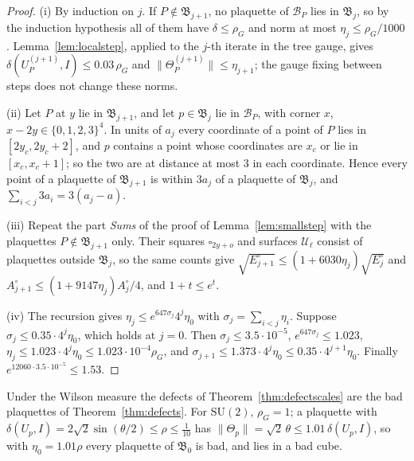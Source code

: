 \documentclass[11pt]{amsart}
\theoremstyle{definition}
\theoremstyle{remark}
\numberwithin{equation}{section}
\newcommand{\SU}{\mathrm{SU}}
\begin{document}
\begin{proof}
(i) By induction on $j$. If $P\notin\mathfrak B_{j+1}$, no plaquette of
$\mathcal B_P$ lies in $\mathfrak B_j$, so by the induction hypothesis all of
them have $\delta\le\rho_G$ and norm at most $\eta_j\le\rho_G/1000$.
Lemma~\ref{lem:localstep}, applied to the $j$-th iterate in the tree gauge,
gives $\delta(U^{(j+1)}_P,I)\le0.03\,\rho_G$ and $\lVert\Theta^{(j+1)}_P
\rVert\le\eta_{j+1}$; the gauge fixing between steps does not change these
norms.

(ii) Let $P$ at $y$ lie in $\mathfrak B_{j+1}$, and let $p\in\mathfrak B_j$
lie in $\mathcal B_P$, with corner $x$, $x-2y\in\{0,1,2,3\}^4$. In units of
$a_j$ every coordinate of a point of $P$ lies in $[2y_c,2y_c+2]$, and $p$
contains a point whose coordinates are $x_c$ or lie in $[x_c,x_c+1]$; so the
two are at distance at most $3$ in each coordinate. Hence every point of a
plaquette of $\mathfrak B_{j+1}$ is within $3a_j$ of a plaquette of
$\mathfrak B_j$, and $\sum_{i<j}3a_i=3(a_j-a)$.

(iii) Repeat the part \emph{Sums} of the proof of Lemma~\ref{lem:smallstep}
with the plaquettes $P\notin\mathfrak B_{j+1}$ only. Their squares
$\square_{2y+o}$ and surfaces $\mathcal U_\ell$ consist of plaquettes outside
$\mathfrak B_j$, so the same counts give $\sqrt{E^\circ_{j+1}}\le(1+6030
\eta_j)\sqrt{E^\circ_j}$ and $A^\circ_{j+1}\le(1+9147\eta_j)A^\circ_j/4$,
and $1+t\le e^t$.

(iv) The recursion gives $\eta_j\le e^{647\sigma_j}4^j\eta_0$ with $\sigma_j=
\sum_{i<j}\eta_i$. Suppose $\sigma_j\le0.35\cdot4^j\eta_0$, which holds at
$j=0$. Then $\sigma_j\le3.5\cdot10^{-5}$, $e^{647\sigma_j}\le1.023$,
$\eta_j\le1.023\cdot4^j\eta_0\le1.023\cdot10^{-4}\rho_G$, and $\sigma_{j+1}
\le1.373\cdot4^j\eta_0\le0.35\cdot4^{j+1}\eta_0$. Finally $e^{12060\cdot
3.5\cdot10^{-5}}\le1.53$.
\end{proof}

Under the Wilson measure the defects of Theorem~\ref{thm:defectscales} are
the bad plaquettes of Theorem~\ref{thm:defects}. For $\SU(2)$, $\rho_G=1$;
a plaquette with $\delta(U_p,I)=2\sqrt2\sin(\theta/2)\le\rho\le\frac1{10}$
has $\lVert\Theta_p\rVert=\sqrt2\,\theta\le1.01\,\delta(U_p,I)$, so with
$\eta_0=1.01\rho$ every plaquette of $\mathfrak B_0$ is bad, and lies in a
bad cube.
\end{document}
